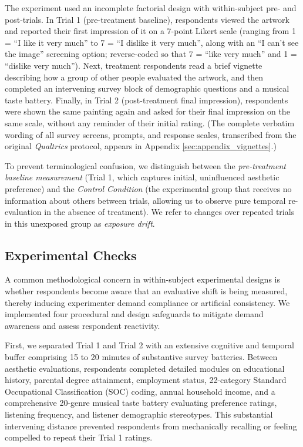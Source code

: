 \documentclass[12pt, letterpaper]{article}
\begin{document}
The experiment used an incomplete factorial design with within-subject pre- and post-trials. In Trial 1 (pre-treatment baseline), respondents viewed the artwork and reported their first impression of it on a 7-point Likert scale (ranging from 1 = ``I like it very much'' to 7 = ``I dislike it very much'', along with an ``I can't see the image'' screening option; reverse-coded so that 7 = ``like very much'' and 1 = ``dislike very much''). Next, treatment respondents read a brief vignette describing how a group of other people evaluated the artwork, and then completed an intervening survey block of demographic questions and a musical taste battery. Finally, in Trial 2 (post-treatment final impression), respondents were shown the same painting again and asked for their final impression on the same scale, without any reminder of their initial rating. (The complete verbatim wording of all survey screens, prompts, and response scales, transcribed from the original \textit{Qualtrics} protocol, appears in Appendix \ref{sec:appendix_vignettes}.)

To prevent terminological confusion, we distinguish between the \textit{pre-treatment baseline measurement} (Trial 1, which captures initial, uninfluenced aesthetic preference) and the \textit{Control Condition} (the experimental group that receives no information about others between trials, allowing us to observe pure temporal re-evaluation in the absence of treatment). We refer to changes over repeated trials in this unexposed group as \textit{exposure drift}.

\subsection{Experimental Checks}
A common methodological concern in within-subject experimental designs is whether respondents become aware that an evaluative shift is being measured, thereby inducing experimenter demand compliance or artificial consistency. We implemented four procedural and design safeguards to mitigate demand awareness and assess respondent reactivity.

First, we separated Trial 1 and Trial 2 with an extensive cognitive and temporal buffer comprising 15 to 20 minutes of substantive survey batteries. Between aesthetic evaluations, respondents completed detailed modules on educational history, parental degree attainment, employment status, 22-category Standard Occupational Classification (SOC) coding, annual household income, and a comprehensive 20-genre musical taste battery evaluating preference ratings, listening frequency, and listener demographic stereotypes. This substantial intervening distance prevented respondents from mechanically recalling or feeling compelled to repeat their Trial 1 ratings.
\end{document}

